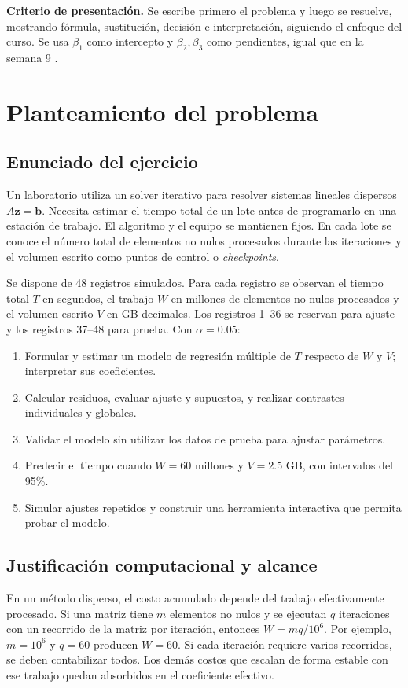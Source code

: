 \documentclass[11pt,a4paper]{article}
\begin{document}
\textbf{Criterio de presentación.} Se escribe primero el problema y luego se resuelve, mostrando fórmula, sustitución, decisión e interpretación, siguiendo el enfoque del curso. Se usa $\beta_1$ como intercepto y $\beta_2,\beta_3$ como pendientes, igual que en la semana 9 \cite{semana9,extracto}.
\begingroup\small\setlength{\parskip}{0pt}\tableofcontents\endgroup
\newpage

\section{Planteamiento del problema}
\subsection*{Enunciado del ejercicio}
Un laboratorio utiliza un solver iterativo para resolver sistemas lineales dispersos $A\boldsymbol z=\boldsymbol b$. Necesita estimar el tiempo total de un lote antes de programarlo en una estación de trabajo. El algoritmo y el equipo se mantienen fijos. En cada lote se conoce el número total de elementos no nulos procesados durante las iteraciones y el volumen escrito como puntos de control o \emph{checkpoints}.

Se dispone de 48 registros simulados. Para cada registro se observan el tiempo total $T$ en segundos, el trabajo $W$ en millones de elementos no nulos procesados y el volumen escrito $V$ en GB decimales. Los registros 1--36 se reservan para ajuste y los registros 37--48 para prueba. Con $\alpha=0.05$:
\begin{enumerate}
\item Formular y estimar un modelo de regresión múltiple de $T$ respecto de $W$ y $V$; interpretar sus coeficientes.
\item Calcular residuos, evaluar ajuste y supuestos, y realizar contrastes individuales y globales.
\item Validar el modelo sin utilizar los datos de prueba para ajustar parámetros.
\item Predecir el tiempo cuando $W=60$ millones y $V=2.5$ GB, con intervalos del 95\%.
\item Simular ajustes repetidos y construir una herramienta interactiva que permita probar el modelo.
\end{enumerate}

\subsection*{Justificación computacional y alcance}
En un método disperso, el costo acumulado depende del trabajo efectivamente procesado. Si una matriz tiene $m$ elementos no nulos y se ejecutan $q$ iteraciones con un recorrido de la matriz por iteración, entonces $W=mq/10^6$. Por ejemplo, $m=10^6$ y $q=60$ producen $W=60$. Si cada iteración requiere varios recorridos, se deben contabilizar todos. Los demás costos que escalan de forma estable con ese trabajo quedan absorbidos en el coeficiente efectivo.
\end{document}
